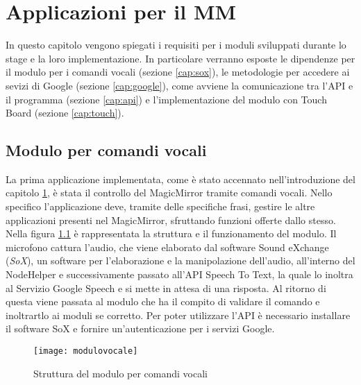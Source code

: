 \chapter{Applicazioni per il MM}\label{capitolo4}
In questo capitolo vengono spiegati i requisiti per i moduli sviluppati durante lo stage e la loro implementazione.
In particolare verranno esposte le dipendenze per il modulo per i comandi vocali (sezione \ref{cap:sox}), le metodologie
per accedere ai sevizi di Google (sezione \ref{cap:google}), come avviene la comunicazione tra l'API e il programma (sezione \ref{cap:api})
e l'implementazione del modulo con Touch Board (sezione \ref{cap:touch}).

\section{Modulo per comandi vocali}\label{cap:voce}
La prima applicazione implementata, come \`e stato accennato nell'introduzione del capitolo \ref{capitolo4}, \`e
stata il controllo del MagicMirror tramite comandi vocali.
Nello specifico l'applicazione deve, tramite delle specifiche frasi,
gestire le altre applicazioni presenti nel MagicMirror, sfruttando funzioni offerte dallo stesso.\\
Nella figura \ref{fig:modulovocale} \`e rappresentata la struttura e il funzionamento del modulo.
Il microfono cattura l'audio, che viene elaborato dal software Sound eXchange (\textit{SoX}), un software per l'elaborazione e la manipolazione
dell'audio, all'interno del NodeHelper e successivamente
passato all'API Speech To Text, la quale lo inoltra al Servizio Google Speech e si mette in attesa di una risposta.
Al ritorno di questa viene passata al modulo che ha il compito di validare il comando e inoltrartlo ai moduli se
corretto.
Per poter utilizzare l'API \`e necessario installare il software SoX e fornire un'autenticazione per i servizi Google.

\begin{figure}[H]
    \texttt{[image: modulovocale]}
    \caption{Struttura del modulo per comandi vocali}
    \label{fig:modulovocale}
\end{figure}

